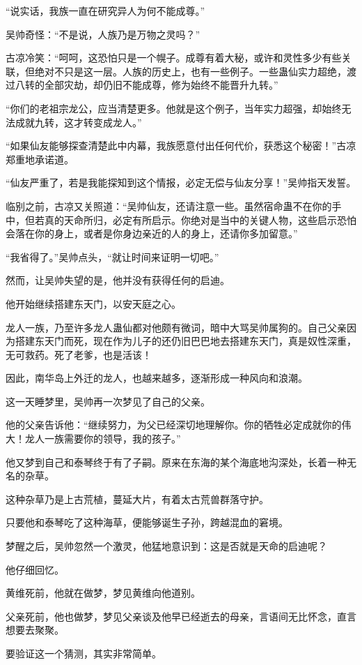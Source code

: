 \begin{this_body}
“说实话，我族一直在研究异人为何不能成尊。”

吴帅奇怪：“不是说，人族乃是万物之灵吗？”

古凉冷笑：“呵呵，这恐怕只是一个幌子。成尊有着大秘，或许和灵性多少有些关联，但绝对不只是这一层。人族的历史上，也有一些例子。一些蛊仙实力超绝，渡过八转的全部灾劫，却仍旧不能成尊，修为始终不能晋升九转。”

“你们的老祖宗龙公，应当清楚更多。他就是这个例子，当年实力超强，却始终无法成就九转，这才转变成龙人。”

“如果仙友能够探查清楚此中内幕，我族愿意付出任何代价，获悉这个秘密！”古凉郑重地承诺道。

“仙友严重了，若是我能探知到这个情报，必定无偿与仙友分享！”吴帅指天发誓。

临别之前，古凉又关照道：“吴帅仙友，还请注意一些。虽然宿命蛊不在你的手中，但若真的天命所归，必定有所启示。你绝对是当中的关键人物，这些启示恐怕会落在你的身上，或者是你身边亲近的人的身上，还请你多加留意。”

“我省得了。”吴帅点头，“就让时间来证明一切吧。”

然而，让吴帅失望的是，他并没有获得任何的启迪。

他开始继续搭建东天门，以安天庭之心。

龙人一族，乃至许多龙人蛊仙都对他颇有微词，暗中大骂吴帅属狗的。自己父亲因为搭建东天门而死，现在作为儿子的还仍旧巴巴地去搭建东天门，真是奴性深重，无可救药。死了老爹，也是活该！

因此，南华岛上外迁的龙人，也越来越多，逐渐形成一种风向和浪潮。

这一天睡梦里，吴帅再一次梦见了自己的父亲。

他的父亲告诉他：“继续努力，为父已经深切地理解你。你的牺牲必定成就你的伟大！龙人一族需要你的领导，我的孩子。”

他又梦到自己和泰琴终于有了子嗣。原来在东海的某个海底地沟深处，长着一种无名的杂草。

这种杂草乃是上古荒植，蔓延大片，有着太古荒兽群落守护。

只要他和泰琴吃了这种海草，便能够诞生子孙，跨越混血的窘境。

梦醒之后，吴帅忽然一个激灵，他猛地意识到：这是否就是天命的启迪呢？

他仔细回忆。

黄维死前，他就在做梦，梦见黄维向他道别。

父亲死前，他也做梦，梦见父亲谈及他早已经逝去的母亲，言语间无比怀念，直言想要去聚聚。

要验证这一个猜测，其实非常简单。


\end{this_body}
